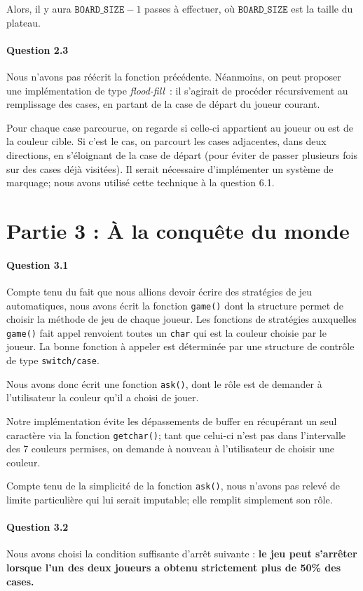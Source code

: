 \documentclass[a4paper]{article}
\newcommand{\boardsize}{\ensuremath{\mathtt{BOARD\_SIZE}}}
\begin{document}
Alors, il y aura $\boardsize-1$ passes à effectuer, où \boardsize{} est la 
taille du plateau. 

    \paragraph{Question 2.3}
    Nous n'avons pas réécrit la fonction précédente. Néanmoins, on peut 
proposer une implémentation de type \emph{flood-fill}~: il s'agirait de 
procéder récursivement au remplissage des cases, en partant de la case de 
départ du joueur courant.

Pour chaque case parcourue, on regarde si celle-ci appartient au joueur ou est 
de la couleur cible. Si c'est le cas, on parcourt les cases adjacentes, dans 
deux directions, en s'éloignant de la case de départ (pour éviter de passer 
plusieurs fois sur des cases déjà visitées). Il serait nécessaire d'implémenter 
un système de marquage; nous avons utilisé cette technique à la question 6.1.

    \section{Partie 3 : À la conquête du monde}
    \paragraph{Question 3.1} Compte tenu du fait que nous allions devoir 
écrire des stratégies de jeu automatiques, nous avons écrit la fonction 
\texttt{game()} dont la structure permet de choisir la méthode de jeu de chaque 
joueur. Les fonctions de stratégies auxquelles \texttt{game()} fait appel 
renvoient toutes un \texttt{char} qui est la couleur choisie par le joueur. La 
bonne fonction à appeler est déterminée par une structure de contrôle de type 
\texttt{switch/case}.

Nous avons donc écrit une fonction \texttt{ask()}, dont le rôle est de demander 
à l'utilisateur la couleur qu'il a choisi de jouer. 

Notre implémentation évite les dépassements de buffer en récupérant un seul 
caractère via la fonction \texttt{getchar()}; tant que celui-ci n'est pas dans 
l'intervalle des 7 couleurs permises, on demande à nouveau à l'utilisateur de 
choisir une couleur.

Compte tenu de la simplicité de la fonction \texttt{ask()}, nous n'avons pas 
relevé de limite particulière qui lui serait imputable; elle remplit simplement 
son rôle.
    \paragraph{Question 3.2}
    Nous avons choisi la condition suffisante d'arrêt suivante : \textbf{le jeu 
peut s'arrêter lorsque l'un des deux joueurs a obtenu strictement plus de 50\% 
des cases.}
\end{document}
